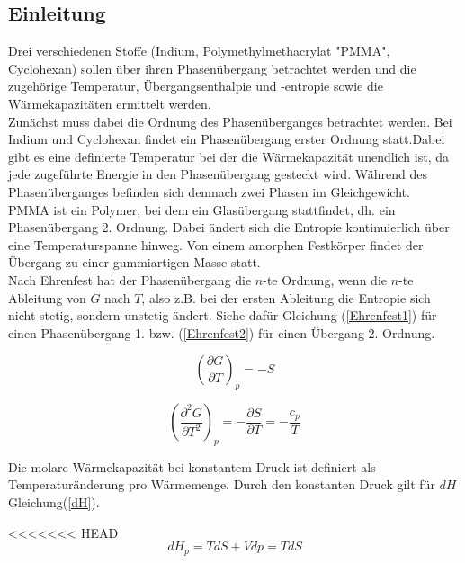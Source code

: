 \documentclass[a4paper,12pt,oneside,onecolum,final,openany]{report}
\begin{document}
\begin{titlepage}
\vspace{1.3cm} 

\tableofcontents %
\newpage


\section{Einleitung}
Drei verschiedenen Stoffe (Indium, Polymethylmethacrylat "PMMA", Cyclohexan) sollen über ihren Phasenübergang betrachtet werden und die zugehörige Temperatur, Übergangsenthalpie und -entropie sowie die Wärmekapazitäten ermittelt werden.\\
Zunächst muss dabei die Ordnung des Phasenüberganges betrachtet werden. Bei Indium und Cyclohexan findet ein Phasenübergang erster Ordnung statt.Dabei gibt es eine definierte Temperatur bei der die Wärmekapazität unendlich ist, da jede zugeführte Energie in den Phasenübergang gesteckt wird. Während des Phasenüberganges befinden sich demnach zwei Phasen im Gleichgewicht.\\
PMMA ist ein Polymer, bei dem ein Glasübergang stattfindet, dh. ein Phasenübergang 2. Ordnung. Dabei ändert sich die Entropie kontinuierlich über eine Temperaturspanne hinweg. Von einem amorphen Festkörper findet der Übergang zu einer gummiartigen Masse statt.\\ 
Nach Ehrenfest hat der Phasenübergang die $n$-te Ordnung, wenn die $n$-te Ableitung von $G$ nach $T$, also z.B. bei der ersten Ableitung die Entropie sich nicht stetig, sondern unstetig ändert. Siehe dafür Gleichung (\ref{Ehrenfest1}) für einen Phasenübergang 1. bzw. (\ref{Ehrenfest2}) für einen Übergang 2. Ordnung.\\ 

\end{titlepage}


\begin{equation} \label{Ehrenfest1}
\left(\frac{\partial G}{\partial T}\right)_p = -S
\end{equation}  
  
\begin{equation} \label{Ehrenfest2}
\left(\frac{\partial^2 G}{\partial T^2}\right)_p = -\frac{\partial S}{\partial T}= - \frac{c_p}{T}
\end{equation}  


Die molare Wärmekapazität bei konstantem Druck ist definiert als Temperaturänderung pro Wärmemenge. Durch den konstanten Druck gilt für $dH$ Gleichung(\ref{dH}). 

<<<<<<< HEAD
\begin{equation} \label{dH}
dH_p= TdS +Vdp =TdS
\end{equation}
\end{document}
